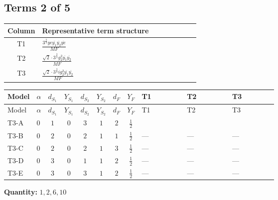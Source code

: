 \documentclass[8pt]{article}
\begin{document}
\begin{landscape}
\subsection*{Terms 2 of 5}
\begin{center}
\begin{tabular}{@{}c >{\raggedright\arraybackslash}p{0.82\linewidth}@{}}
\toprule
Column & Representative term structure \\
\midrule
T1 & \(\displaystyle \frac{3^{\frac{3}{4}} ye \overline{y_{1}} \overline{y_{2}} \overline{ye}}{MF}\) \\
\midrule
T2 & \(\displaystyle \frac{\sqrt{2} \cdot 3^{\frac{3}{4}} g_{2}^{2} \overline{y_{1}} \overline{y_{2}}}{MF}\) \\
\midrule
T3 & \(\displaystyle \frac{\sqrt{2} \cdot 3^{\frac{3}{4}} i g_{2}^{2} \overline{y_{1}} \overline{y_{2}}}{MF}\) \\
\midrule
\bottomrule
\end{tabular}
\end{center}
\smallskip
\tiny
\begin{longtable}{@{}llcccccc >{\raggedright\arraybackslash}p{0.21\linewidth} >{\raggedright\arraybackslash}p{0.21\linewidth} >{\raggedright\arraybackslash}p{0.21\linewidth}@{}}
\toprule
Model & $\alpha$ & $d_{S_1}$ & $Y_{S_1}$ & $d_{S_2}$ & $Y_{S_2}$ & $d_F$ & $Y_F$ & T1 & T2 & T3 \\
\midrule
\endfirsthead
\toprule
Model & $\alpha$ & $d_{S_1}$ & $Y_{S_1}$ & $d_{S_2}$ & $Y_{S_2}$ & $d_F$ & $Y_F$ & T1 & T2 & T3 \\
\midrule
\endhead
T3-A & $0$ & $1$ & $0$ & $3$ & $1$ & $2$ & $\frac{1}{2}$ & \scriptsize\adjustbox{max width=\linewidth}{$\begin{gathered} - \frac{3^{\frac{3}{4}} ye \overline{y_{1}} \overline{y_{2}} \overline{ye}}{12 MF}\end{gathered}$} & \scriptsize\adjustbox{max width=\linewidth}{$\begin{gathered} \frac{\sqrt{2} \cdot 3^{\frac{3}{4}} g_{2}^{2} \overline{y_{1}} \overline{y_{2}}}{6 MF}\end{gathered}$} & \scriptsize\adjustbox{max width=\linewidth}{$\begin{gathered} - \frac{\sqrt{2} \cdot 3^{\frac{3}{4}} i g_{2}^{2} \overline{y_{1}} \overline{y_{2}}}{6 MF}\end{gathered}$} \\
\midrule
T3-B & $0$ & $2$ & $0$ & $2$ & $1$ & $1$ & $\frac{1}{2}$ & --- & --- & --- \\
\midrule
T3-C & $0$ & $2$ & $0$ & $2$ & $1$ & $3$ & $\frac{1}{2}$ & --- & --- & --- \\
\midrule
T3-D & $0$ & $3$ & $0$ & $1$ & $1$ & $2$ & $\frac{1}{2}$ & --- & --- & --- \\
\midrule
T3-E & $0$ & $3$ & $0$ & $3$ & $1$ & $2$ & $\frac{1}{2}$ & --- & --- & --- \\
\midrule
\bottomrule
\end{longtable}
\clearpage
\noindent\textbf{Quantity: }$\mathrm{1,2,6,10}$\par\smallskip

\end{landscape}
\end{document}
